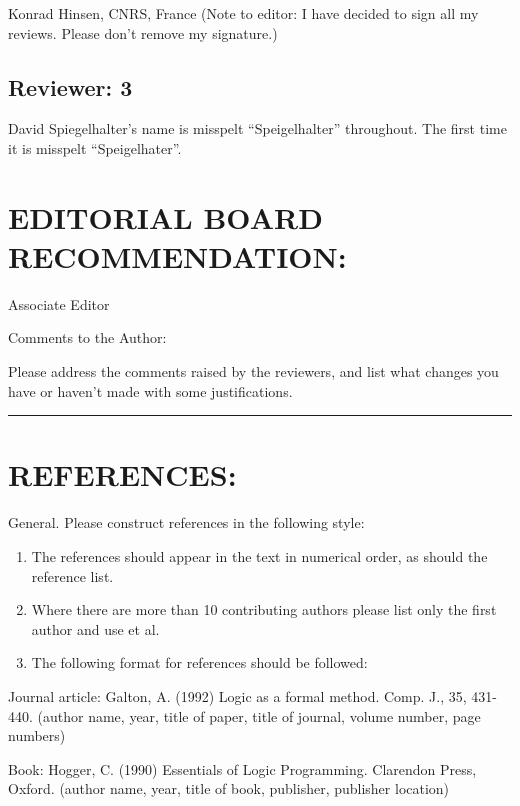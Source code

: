 \documentclass[11pt]{article}
\begin{document}
Konrad Hinsen, CNRS, France
(Note to editor: I have decided to sign all my reviews. Please don't remove my signature.)


\subsection{Reviewer: 3}

David Spiegelhalter's name is misspelt ``Speigelhalter'' throughout. The first time it is misspelt ``Speigelhater''.   

\section{EDITORIAL BOARD RECOMMENDATION:}

Associate Editor

Comments to the Author:

Please address the comments raised by the reviewers, and list what changes you have or haven't made with some justifications.

\vskip 1cm\hrule

\section{REFERENCES:}

General. Please construct references in the following style:

\begin{enumerate}\raggedright\item The references should appear in the text in numerical order, as should the reference list. 
\item  Where there are more than 10 contributing authors please list only the first author and use et al. 
\item  The following format for references should be followed: 
\end{enumerate}

Journal article:
Galton, A. (1992) Logic as a formal method. Comp. J., 35, 431-440.
(author name, year, title of paper, title of journal, volume number, page numbers)

Book:
Hogger, C. (1990) Essentials of Logic Programming. Clarendon Press, Oxford.
(author name, year, title of book, publisher, publisher location)
\end{document}

